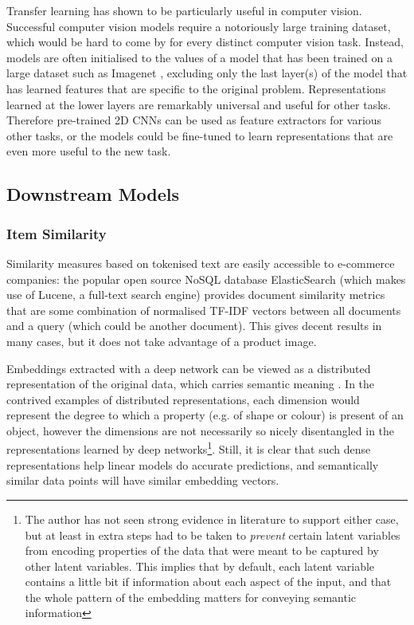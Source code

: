 Transfer learning has shown to be particularly useful in computer vision.
Successful computer vision models require a notoriously large training dataset, which would be hard to come by for every distinct computer vision task.
Instead, models are often initialised to the values of a model that has been trained on a large dataset such as Imagenet \cite{}, excluding only the last layer(s) of the model that has learned features that are specific to the original problem.
Representations learned at the lower layers are remarkably  universal and useful for other tasks.
Therefore pre-trained 2D CNNs can be used as feature extractors for various other tasks,  or the models could be fine-tuned to learn representations that are even more useful to the new task.

\subsection{Downstream Models}

\subsubsection{Item Similarity}
\label{bg_sim}

Similarity measures based on tokenised text are easily accessible to e-commerce companies: the popular open source NoSQL database ElasticSearch (which makes use of Lucene, a full-text search engine) provides document similarity metrics that are some combination of normalised TF-IDF vectors between all documents and a query (which could be another document).
This gives decent results in many cases, but it does not take advantage of a product image.

Embeddings extracted with a deep network can be viewed as a distributed representation of the original data, which carries semantic meaning \cite{distributed_reps}.
In the contrived examples of distributed representations, each dimension would represent the degree to which a property (e.g. of shape or colour) is present of an object, however the dimensions are not necessarily so nicely disentangled in the representations learned by deep networks\footnote{The author has not seen strong evidence in literature to support either case, but at least in \cite{towards} extra steps had to be taken to \textit{prevent} certain latent variables from encoding properties of the data that were meant to be captured by other latent variables. This implies that by default, each latent variable contains a little bit if information about each aspect of the input, and that the whole pattern of the embedding matters for conveying semantic information}.
Still, it is clear that such dense representations help linear models do accurate predictions, and semantically similar data points will have similar embedding vectors.

